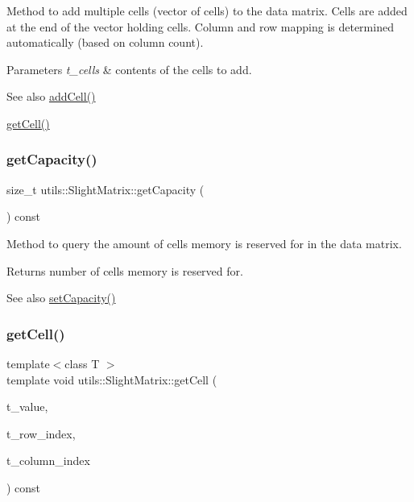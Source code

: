 Method to add multiple cells (vector of cells) to the data matrix. Cells are added at the end of the vector holding cells. Column and row mapping is determined automatically (based on column count). 
\begin{DoxyParams}{Parameters}
{\em t\+\_\+cells} & contents of the cells to add. \\
\hline
\end{DoxyParams}
\begin{DoxySeeAlso}{See also}
\hyperlink{classutils_1_1SlightMatrix_a06f6b4d49818f6f1befea6109ad7b5f6}{add\+Cell()} 

\hyperlink{classutils_1_1SlightMatrix_ac6757baf9bab12a6a92dae96015e39a1}{get\+Cell()} 
\end{DoxySeeAlso}
\mbox{\label{classutils_1_1SlightMatrix_addbfd1ec641100a7cda0b4f6e39ae676}} 
\subsubsection{\texorpdfstring{get\+Capacity()}{getCapacity()}}
{\footnotesize\ttfamily size\+\_\+t utils\+::\+Slight\+Matrix\+::get\+Capacity (\begin{DoxyParamCaption}\item[{void}]{ }\end{DoxyParamCaption}) const}

Method to query the amount of cells memory is reserved for in the data matrix. \begin{DoxyReturn}{Returns}
number of cells memory is reserved for. 
\end{DoxyReturn}
\begin{DoxySeeAlso}{See also}
\hyperlink{classutils_1_1SlightMatrix_a60585fa6bfe89f8fb2e477f6811c6741}{set\+Capacity()} 
\end{DoxySeeAlso}
\mbox{\label{classutils_1_1SlightMatrix_ac6757baf9bab12a6a92dae96015e39a1}} 
\subsubsection{\texorpdfstring{get\+Cell()}{getCell()}}
{\footnotesize\ttfamily template$<$class T $>$ \\
template void utils\+::\+Slight\+Matrix\+::get\+Cell (\begin{DoxyParamCaption}\item[{T \&}]{t\+\_\+value,  }\item[{size\+\_\+t}]{t\+\_\+row\+\_\+index,  }\item[{size\+\_\+t}]{t\+\_\+column\+\_\+index }\end{DoxyParamCaption}) const}

